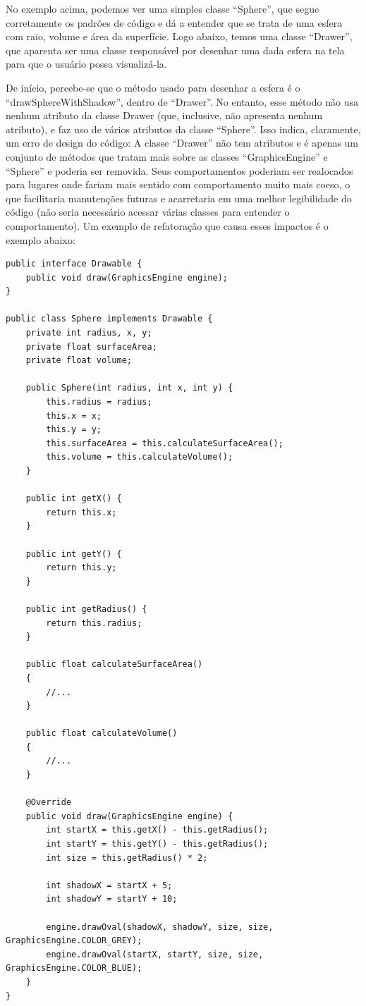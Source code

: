 \documentclass[12pt,a4paper]{article}
\begin{document}
No exemplo acima, podemos ver uma simples classe “Sphere”, que segue corretamente os padrões de código e dá a entender que se trata de uma esfera com raio, volume e área da superfície. Logo abaixo, temos uma classe “Drawer”, que aparenta ser uma classe responsável por desenhar uma dada esfera na tela para que o usuário possa visualizá-la.

De início, percebe-se que o método usado para desenhar a esfera é o “drawSphereWithShadow”, dentro de “Drawer”. No entanto, esse método não usa nenhum atributo da classe Drawer (que, inclusive, não apresenta nenhum atributo), e faz uso de vários atributos da classe “Sphere”. Isso indica, claramente, um erro de design do código: A classe “Drawer” não tem atributos e é apenas um conjunto de métodos que tratam mais sobre as classes “GraphicsEngine” e “Sphere” e poderia ser removida. Seus comportamentos poderiam ser realocados para lugares onde fariam mais sentido com comportamento muito mais coeso, o que facilitaria manutenções futuras e acarretaria em uma melhor legibilidade do código (não seria necessário acessar várias classes para entender o comportamento). Um exemplo de refatoração que causa esses impactos é o exemplo abaixo:

\begin{lstlisting}[caption={Feature Envy: comportamento movido para Sphere},label={lst:sphere-after}]
public interface Drawable {
    public void draw(GraphicsEngine engine);
}

public class Sphere implements Drawable {
    private int radius, x, y;
    private float surfaceArea;
    private float volume;

    public Sphere(int radius, int x, int y) {
        this.radius = radius;
        this.x = x;
        this.y = y;
        this.surfaceArea = this.calculateSurfaceArea();
        this.volume = this.calculateVolume();
    }

    public int getX() {
        return this.x;
    }

    public int getY() {
        return this.y;
    }

    public int getRadius() {
        return this.radius;
    }

    public float calculateSurfaceArea()
    {
        //...
    }

    public float calculateVolume()
    {
        //...
    }

    @Override
    public void draw(GraphicsEngine engine) {
        int startX = this.getX() - this.getRadius();
        int startY = this.getY() - this.getRadius();
        int size = this.getRadius() * 2;

        int shadowX = startX + 5;
        int shadowY = startY + 10;

        engine.drawOval(shadowX, shadowY, size, size, GraphicsEngine.COLOR_GREY);
        engine.drawOval(startX, startY, size, size, GraphicsEngine.COLOR_BLUE);
    }
}

\end{lstlisting}
\end{document}

